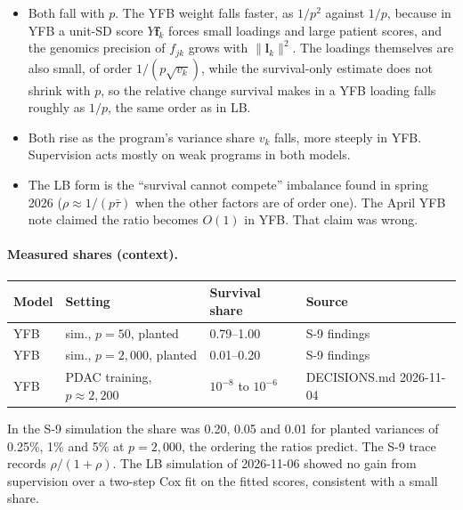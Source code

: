 \documentclass[11pt]{article}
\begin{document}
\begin{keybox}
\begin{itemize}
  \item Both fall with $p$. The YFB weight falls faster, as $1/p^2$ against $1/p$,
        because in YFB a unit-SD score $Y\bm f_k$ forces small loadings and large
        patient scores, and the genomics precision of $f_{jk}$ grows with
        $\lVert\bm l_k\rVert^2$. The loadings themselves are also small, of order
        $1/(p\sqrt{v_k})$, while the survival-only estimate does not shrink with $p$,
        so the relative change survival makes in a YFB loading falls roughly as
        $1/p$, the same order as in LB.
  \item Both rise as the program's variance share $v_k$ falls, more steeply in
        YFB. Supervision acts mostly on weak programs in both models.
  \item The LB form is the ``survival cannot compete'' imbalance found in
        spring 2026 ($\rho\approx 1/(p\bar\tau)$ when the other factors are of
        order one). The April YFB note claimed the ratio becomes $O(1)$ in YFB.
        That claim was wrong.
\end{itemize}
\end{keybox}

\paragraph{Measured shares (context).}
\begin{center}
\small
\begin{tabular}{llll}
\toprule
Model & Setting & Survival share & Source \\
\midrule
YFB & sim., $p = 50$, planted & 0.79--1.00 & S-9 findings \\
YFB & sim., $p = 2{,}000$, planted & 0.01--0.20 & S-9 findings \\
YFB & PDAC training, $p\approx 2{,}200$ & $10^{-8}$ to $10^{-6}$ & DECISIONS.md 2026-11-04 \\
\bottomrule
\end{tabular}
\end{center}
In the S-9 simulation the share was 0.20, 0.05 and 0.01 for planted variances
of 0.25\%, 1\% and 5\% at $p = 2{,}000$, the ordering the ratios predict. The S-9 trace records
$\rho/(1+\rho)$. The LB simulation of 2026-11-06 showed no gain from supervision
over a two-step Cox fit on the fitted scores, consistent with a small share.
\end{document}
